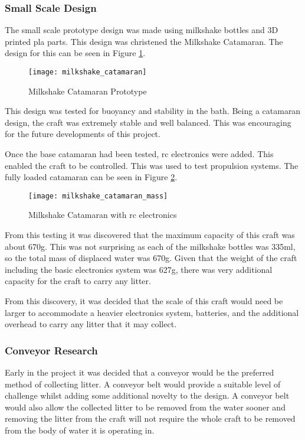 \documentclass [11pt]{article}
\begin{document}
\subsubsection{Small Scale Design}

The small scale prototype design was made using milkshake bottles and 3D printed \gls{pla} parts. This design was christened the Milkshake Catamaran. The design for this can be seen in Figure \ref{fig:milkshake_catamaran}.

\begin{figure}[H]
\centerline{\texttt{[image: milkshake\_catamaran]}}
\caption{Milkshake Catamaran Prototype}
\label{fig:milkshake_catamaran}
\end{figure}

This design was tested for buoyancy and stability in the bath. Being a \gls{catamaran} design, the craft was extremely stable and well balanced. This was encouraging for the future developments of this project. 

Once the base catamaran had been tested, \gls{rc} electronics were added. This enabled the craft to be controlled. This was used to test propulsion systems. The fully loaded \gls{catamaran} can be seen in Figure \ref{fig:milkshake_catamaran_mass}.   

\begin{figure}[H]
\centerline{\texttt{[image: milkshake\_catamaran\_mass]}}
\caption{Milkshake Catamaran with \gls{rc} electronics}
\label{fig:milkshake_catamaran_mass}
\end{figure}

From this testing it was discovered that the maximum capacity of this craft was about 670g. This was not surprising as each of the milkshake bottles was 335ml, so the total mass of displaced water was 670g. Given that the weight of the craft including the basic electronics system was 627g, there was very additional capacity for the craft to carry any litter.

From this discovery, it was decided that the scale of this craft would need be larger to accommodate a heavier electronics system, batteries, and the additional overhead to carry any litter that it may collect.

\subsubsection{Conveyor Research}

Early in the project it was decided that a conveyor would be the preferred method of collecting litter. A conveyor belt would provide a suitable level of challenge whilst adding some additional novelty to the design. A conveyor belt would also allow the collected litter to be removed from the water sooner and removing the litter from the craft will not require the whole craft to be removed from the body of water it is operating in. 
\end{document}
